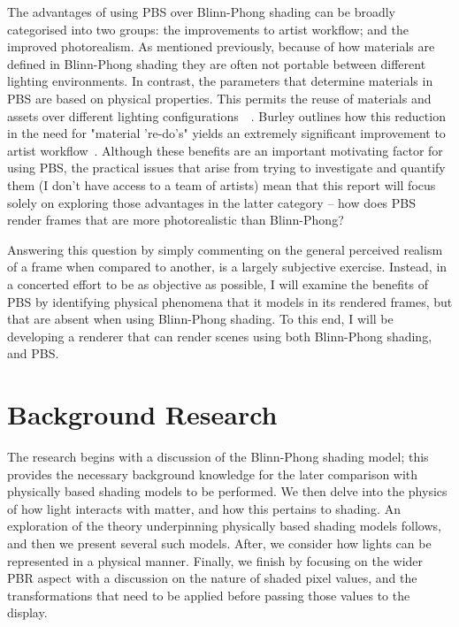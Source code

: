 The advantages of using PBS over Blinn-Phong shading can be broadly categorised into two groups: the improvements to artist workflow; and the improved photorealism. As mentioned previously, because of how materials are defined in Blinn-Phong shading they are often not portable between different lighting environments. In contrast, the parameters that determine materials in PBS are based on physical properties. This permits the reuse of materials and assets over different lighting configurations~\cite{MovingFrostbitetoPBR}~\cite{SIGGRAPH2020Course}. Burley outlines how this reduction in the need for "material 're-do's" yields an extremely significant improvement to artist workflow~\cite{Burley2012Physically}. Although these benefits are an important motivating factor for using PBS, the practical issues that arise from trying to investigate and quantify them (I don’t have access to a team of artists) mean that this report will focus solely on exploring those advantages in the latter category – how does PBS render frames that are more photorealistic than Blinn-Phong?

Answering this question by simply commenting on the general perceived realism of a frame when compared to another, is a largely subjective exercise. Instead, in a concerted effort to be as objective as possible, I will examine the benefits of PBS by identifying physical phenomena that it models in its rendered frames, but that are absent when using Blinn-Phong shading. To this end, I will be developing a renderer that can render scenes using both Blinn-Phong shading, and PBS.

\section{Background Research}

The research begins with a discussion of the Blinn-Phong shading model; this provides the necessary background knowledge for the later comparison with physically based shading models to be performed. We then delve into the physics of how light interacts with matter, and how this pertains to shading. An exploration of the theory underpinning physically based shading models follows, and then we present several such models. After, we consider how lights can be represented in a physical manner. Finally, we finish by focusing on the wider PBR aspect with a discussion on the nature of shaded pixel values, and the transformations that need to be applied before passing those values to the display.

